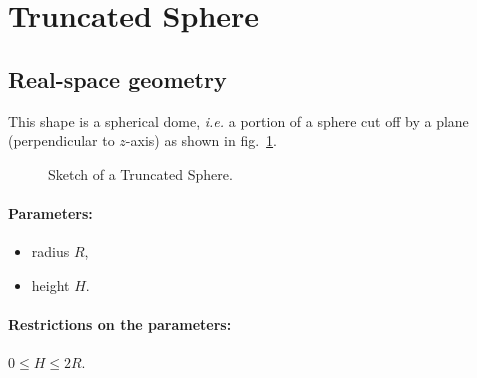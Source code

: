 \section{Truncated Sphere}
  
\subsection{Real-space geometry}
This shape is a spherical dome, \textit{i.e.} a portion of a sphere cut off by a plane (perpendicular
to $z$-axis) as shown in fig.~\ref{fig:sphere}.

\begin{figure}[ht]
\hfill
{}
\hfill
{}
\hfill
\caption{Sketch of a Truncated Sphere.}
\label{fig:sphere}
\end{figure}
\FloatBarrier

\paragraph{Parameters:}
\begin{itemize}
\item radius $R$,
\item height $H$.
\end{itemize}

\paragraph{Restrictions on the parameters:} $0 \leq H\leq 2R$.

